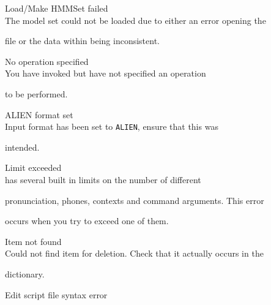 \begin{itemize}
\begin{itemize}
    Load/Make HMMSet failed\\


        The model set could not be loaded due to either an error opening the


        file or the data within being inconsistent.





 No operation specified\\


        You have invoked  but have not specified an operation 


        to be performed.





    ALIEN format set\\


        Input format has been set to \texttt{ALIEN}, ensure that this was 


        intended.





\end{itemize}










\begin{itemize}


 Limit exceeded\\


         has several built in limits on the number of different


        pronunciation, phones, contexts and command arguments.  This error 


        occurs when you try to exceed one of them.  





 Item not found\\


        Could not find item for deletion.  Check that it actually occurs in the


        dictionary.





 Edit script file syntax error\\



\end{itemize}
\end{itemize}
